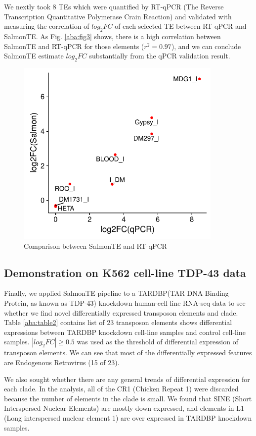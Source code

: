 \documentclass{ws-procs11x85}
\begin{document}
We nextly took 8 TEs which were quantified by RT-qPCR
(The Reverse Transcription Quantitative Polymerase Crain Reaction)
and validated with measuring the correlation of $log_{2}FC$ of each selected TE between RT-qPCR and SalmonTE.
As Fig. \ref{aba:fig3} shows, there is a high correlation between SalmonTE and RT-qPCR for those elements ($r^2=0.97$), and we can conclude
SalmonTE estimate $log_{2}FC$ substantially from the qPCR validation result.

\begin{figure}[h]
\centerline{
\includegraphics[width=10cm]{supp_fig3_corr}
}
\caption{Comparison between SalmonTE and RT-qPCR}
\label{aba:fig4}
\end{figure}


\subsection{Demonstration on K562 cell-line TDP-43 data}

Finally, we applied SalmonTE pipeline to a TARDBP(TAR DNA Binding Protein, as known as TDP-43) knockdown human-cell line RNA-seq data to see whether we find novel differentially expressed transposon elements and clade. 
Table \ref{aba:table2} contains list of 23 transposon elements shows differential expressions between TARDBP knockdown cell-line
samples and control cell-line samples. $|log_{2}FC| \geq 0.5$ was used as the threshold of differential expression of transposon elements. We can see that most of the differentially expressed features are Endogenous Retrovirus (15 of 23). 


We also sought whether there are any general trends of differential expression for each clade. 
In the analysis, all of the CR1 (Chicken Repeat 1) were discarded because the number of elements in the clade is small.
We found that SINE (Short Interspersed Nuclear Elements) are mostly down expressed,
and elements in L1 (Long interspersed nuclear element 1) are over expressed in TARDBP knockdown samples. 
\end{document}

